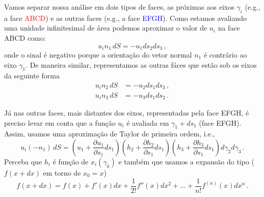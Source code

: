 Vamos separar nossa an\'alise em dois tipos de faces, as pr\'oximas aos eixos
$\gamma_{i}$ (e.g., a face \textcolor{red}{ABCD}) e as outras faces (e.g., a
face \textcolor{blue}{EFGH}).
Como estamos avaliando uma unidade infinitesimal de \'area podemos aproximar o valor de
$u_i$ na face ABCD como:
\begin{equation}
u_in_1\,dS=-u_{1}ds_{2}ds_{3}\, ,
\end{equation}
onde o sinal \'e negativo porque a orienta\c{c}\~ao do vetor normal $n_1$ \'e
contr\'ario ao eixo $\gamma_1$. De maneira similar, representamos as outras
f\'aces que est\~ao sob os eixos da seguinte forma
\begin{align}
  u_in_2\,dS&=-u_{2}ds_{1}ds_{3}\, , \\
  u_in_3\,dS&=-u_{3}ds_{1}ds_{2}\, .
\end{align}

J\'a nas outras faces, mais distantes dos eixos, representadas pela face EFGH,
\'e preciso levar em conta que a fun\c{c}\~ao $u_i$ \'e avaliada em
$\gamma_1+ds_1$  (face EFGH). Assim, usamos uma aproxima\c{c}\~ao
de Taylor de primeira ordem, i.e.,
\begin{equation}
  u_i(-n_1)\,dS = \left(u_1 + \frac{\partial u_1}{\partial s_1}ds_1\right)
  \left(h_2 + \frac{\partial h_2}{\partial s_1}ds_1\right)
  \left(h_3 + \frac{\partial h_3}{\partial
  s_1}ds_1\right)d\gamma_2d\gamma_3\, .
  \label{eq:taylorface}
\end{equation}
Perceba que $h_i$ \'e fun\c{c}\~ao de $x_i(\gamma_k)$ e tamb\'em que usamos a expans\~ao do tipo
($f(x+dx)$ em torno de $x_0 = x$)
\begin{equation}
  f(x+dx) = f(x) + f'(x)dx + \frac{1}{2!}f''(x)dx^2 + \dots
  +\frac{1}{n!}f^{(n)}(x)dx^n \, .
\end{equation}

